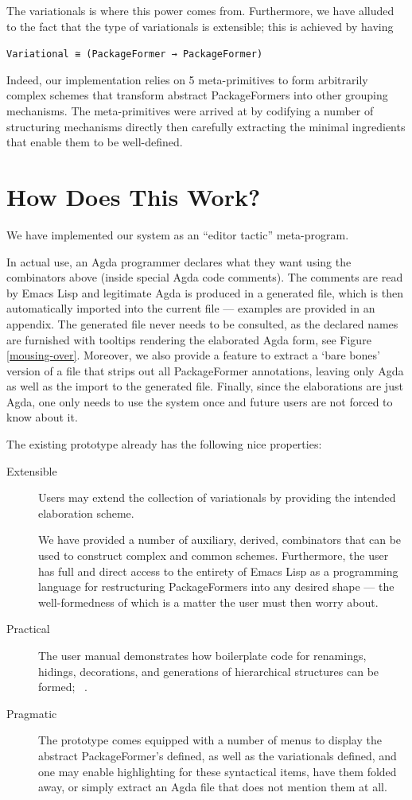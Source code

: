 \documentclass[sigplan,screen]{acmart}
\begin{document}
The variationals is where this power comes from.  Furthermore, we have alluded to
the fact that the type of variationals
is extensible; this is achieved by having
\begin{center}
\texttt{Variational ≅ (PackageFormer → PackageFormer)}
\end{center}
\noindent
Indeed, our implementation relies on 5 meta-primitives to form arbitrarily
complex schemes that transform abstract \textsf{PackageFormer}s into
other grouping mechanisms. The meta-primitives were arrived at by codifying
a number of structuring mechanisms directly then carefully extracting the minimal
ingredients that enable them to be well-defined.

\section{How Does This Work?}
\label{sec:org4833411}

We have implemented our system as an “editor tactic” meta-program.

In actual use, an Agda programmer declares what they want
using the combinators above (inside special Agda code comments).
The comments are read by Emacs Lisp and legitimate Agda is produced in a generated file, which is
then automatically imported into the current file --- examples are provided in an appendix.
The generated file never needs to be consulted,
as the declared names are furnished with tooltips rendering the elaborated
Agda form, see Figure \ref{mousing-over}. Moreover, we also provide a feature to extract a ‘bare bones’ version
of a file that strips out all \textsf{PackageFormer} annotations, leaving only Agda
as well as the import to the generated file. Finally, since the elaborations are
just Agda, one only needs to use the system once and future users are
not forced to know about it.

The existing prototype already has the following nice properties:
\begin{description}
\item[{Extensible}] Users may extend the collection of variationals by providing the intended
elaboration scheme.

We have provided a number of auxiliary, derived, combinators
that can be used to construct complex and common schemes.
Furthermore, the user has full and direct access to the entirety of Emacs Lisp
as a programming language for restructuring \textsf{PackageFormer}s into any desired shape
--- the well-formedness of which is a matter the user must then worry about.

\item[{Practical}] The user manual demonstrates how boilerplate code for
renamings, hidings, decorations, and generations
of hierarchical structures can be formed;~ \cite{tpc}.

\item[{Pragmatic}] The prototype comes equipped with a number of menus
to display the abstract \textsf{PackageFormer}'s defined,
as well as the variationals defined, and one may
enable highlighting for these syntactical items, have them
folded away, or simply extract an Agda file that does not mention
them at all.
\end{description}
\end{document}
